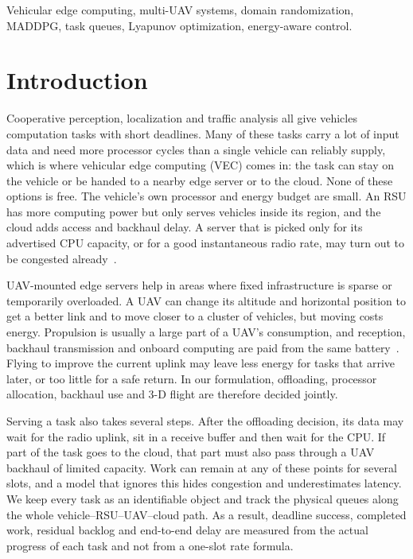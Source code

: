 \documentclass[journal]{IEEEtran}
\begin{document}
\begin{IEEEkeywords}
Vehicular edge computing, multi-UAV systems, domain randomization, MADDPG,
task queues, Lyapunov optimization, energy-aware control.
\end{IEEEkeywords}

\section{Introduction}
Cooperative perception, localization and traffic analysis all give vehicles
computation tasks with short deadlines. Many of these tasks carry a lot of
input data and need more processor cycles than a single vehicle can reliably
supply, which is where vehicular edge computing (VEC) comes in: the task can
stay on the vehicle or be handed to a nearby edge server or to the cloud.
None of these options is free. The vehicle's own processor and energy budget
are small. An RSU has more computing power but only serves vehicles inside
its region, and the cloud adds access and backhaul delay. A server that is
picked only for its advertised CPU capacity, or for a good instantaneous
radio rate, may turn out to be congested
already~\cite{liu2020uav,liang2025rav}.

UAV-mounted edge servers help in areas where fixed infrastructure is sparse
or temporarily overloaded. A UAV can change its altitude and horizontal
position to get a better link and to move closer to a cluster of vehicles,
but moving costs energy. Propulsion is usually a large part of a UAV's
consumption, and reception, backhaul transmission and onboard computing are
paid from the same battery~\cite{liu2020uav,talukdar2026mappo}. Flying to
improve the current uplink may leave less energy for tasks that arrive later,
or too little for a safe return. In our formulation, offloading, processor
allocation, backhaul use and 3-D flight are therefore decided jointly.

Serving a task also takes several steps. After the offloading decision, its
data may wait for the radio uplink, sit in a receive buffer and then wait for
the CPU. If part of the task goes to the cloud, that part must also pass
through a UAV backhaul of limited capacity. Work can remain at any of these
points for several slots, and a model that ignores this hides congestion and
underestimates latency. We keep every task as an identifiable object and
track the physical queues along the whole vehicle--RSU--UAV--cloud path. As a
result, deadline success, completed work, residual backlog and end-to-end
delay are measured from the actual progress of each task and not from a
one-slot rate formula.
\end{document}
